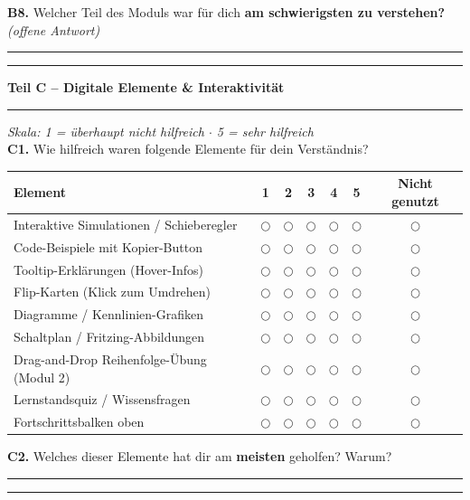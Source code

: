 \documentclass[a4paper,10pt]{article}
\newcommand{\radio}{\textsf{\Large$\bigcirc$}}
\newcommand{\linefill}{\rule{\linewidth}{0.4pt}\vspace{1.2ex}}
\begin{document}
\vspace{5pt}
\textbf{B8.} Welcher Teil des Moduls war für dich \textbf{am schwierigsten zu verstehen?} \textit{(offene Antwort)}\\
\linefill
\linefill

\newpage

{\large \bfseries \color{primary} Teil C – Digitale Elemente \& Interaktivität}\\[-4pt]
\color{accent}\rule{\linewidth}{1.5pt}\color{black}\vspace{2pt}
{\small\itshape Skala: 1 = überhaupt nicht hilfreich $\cdot$ 5 = sehr hilfreich}\\[4pt]

\textbf{C1.} Wie hilfreich waren folgende Elemente für dein Verständnis?\\[4pt]
\begin{tabularx}{\linewidth}{X c c c c c c}
\toprule
\textbf{Element} & \textbf{1} & \textbf{2} & \textbf{3} & \textbf{4} & \textbf{5} & \textbf{Nicht genutzt} \\
\midrule
Interaktive Simulationen / Schieberegler & \radio & \radio & \radio & \radio & \radio & \radio \\
Code-Beispiele mit Kopier-Button & \radio & \radio & \radio & \radio & \radio & \radio \\
Tooltip-Erklärungen (Hover-Infos) & \radio & \radio & \radio & \radio & \radio & \radio \\
Flip-Karten (Klick zum Umdrehen) & \radio & \radio & \radio & \radio & \radio & \radio \\
Diagramme / Kennlinien-Grafiken & \radio & \radio & \radio & \radio & \radio & \radio \\
Schaltplan / Fritzing-Abbildungen & \radio & \radio & \radio & \radio & \radio & \radio \\
Drag-and-Drop Reihenfolge-Übung (Modul 2) & \radio & \radio & \radio & \radio & \radio & \radio \\
Lernstandsquiz / Wissensfragen & \radio & \radio & \radio & \radio & \radio & \radio \\
Fortschrittsbalken oben & \radio & \radio & \radio & \radio & \radio & \radio \\
\bottomrule
\end{tabularx}

\vspace{8pt}

\textbf{C2.} Welches dieser Elemente hat dir am \textbf{meisten} geholfen? Warum?\\
\linefill
\linefill
\end{document}
